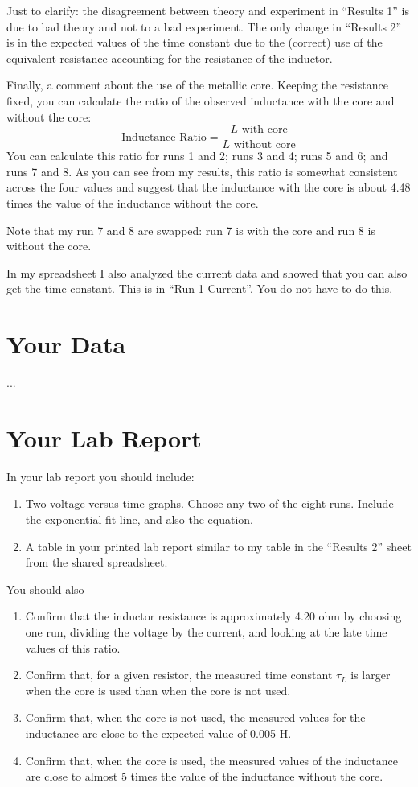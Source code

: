 Just to clarify: the disagreement between theory and experiment in ``Results 1'' is due to bad theory and not to a bad experiment. The only change in ``Results 2'' is in the expected values of the time constant due to the (correct) use of the equivalent resistance accounting for the resistance of the inductor.

Finally, a comment about the use of the metallic core. Keeping the resistance fixed, you can calculate the ratio of the observed inductance with the core and without the core:
\begin{equation}
	\text{Inductance Ratio} = \frac{L \text{ with core}}{L \text{ without core}}
\end{equation}
You can calculate this ratio for runs 1 and 2; runs 3 and 4; runs 5 and 6; and runs 7 and 8. As you can see from my results, this ratio is somewhat consistent across the four values and suggest that the inductance with the core is about 4.48 times the value of the inductance without the core.

Note that my run 7 and 8 are swapped: run 7 is with the core and run 8 is without the core.

In my spreadsheet I also analyzed the current data and showed that you can also get the time constant. This is in ``Run 1 Current''. You do not have to do this.
%
\section{Your Data}
%
...
%
\section{Your Lab Report}
%
In your lab report you should include:
\begin{enumerate}
	\item Two voltage versus time graphs. Choose any two of the eight runs. Include the exponential fit line, and also the equation.
	\item A table in your printed lab report similar to my table in the ``Results 2'' sheet from the shared spreadsheet.
\end{enumerate}
You should also
\begin{enumerate}
	\item Confirm that the inductor resistance is approximately 4.20 ohm by choosing one run, dividing the voltage by the current, and looking at the late time values of this ratio.
	\item Confirm that, for a given resistor, the measured time constant $\tau_{L}$ is larger when the core is used than when the core is not used.
	\item Confirm that, when the core is not used, the measured values for the inductance are close to the expected value of 0.005 H.
	\item Confirm that, when the core is used, the measured values of the inductance are close to almost 5 times the value of the inductance without the core.
\end{enumerate}